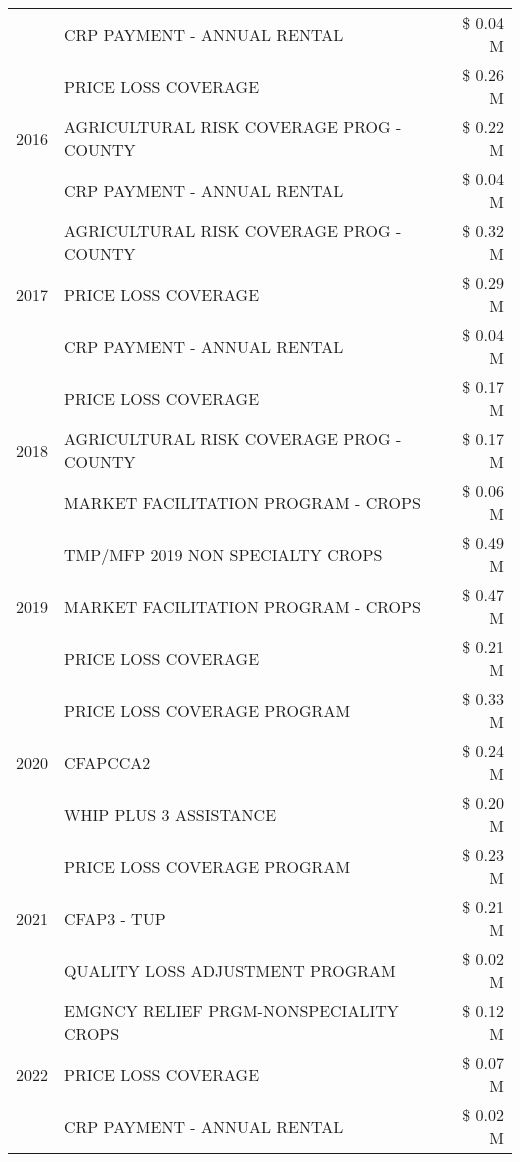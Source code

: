 \begin{tabular}{llr}
 & CRP PAYMENT - ANNUAL RENTAL & \$ 0.04 M \\
\cline{1-3}
\multirow[t]{3}{*}{2016} & PRICE LOSS COVERAGE & \$ 0.26 M \\
 & AGRICULTURAL RISK COVERAGE PROG - COUNTY & \$ 0.22 M \\
 & CRP PAYMENT - ANNUAL RENTAL & \$ 0.04 M \\
\cline{1-3}
\multirow[t]{3}{*}{2017} & AGRICULTURAL RISK COVERAGE PROG - COUNTY & \$ 0.32 M \\
 & PRICE LOSS COVERAGE & \$ 0.29 M \\
 & CRP PAYMENT - ANNUAL RENTAL & \$ 0.04 M \\
\cline{1-3}
\multirow[t]{3}{*}{2018} & PRICE LOSS COVERAGE & \$ 0.17 M \\
 & AGRICULTURAL RISK COVERAGE PROG - COUNTY & \$ 0.17 M \\
 & MARKET FACILITATION PROGRAM - CROPS & \$ 0.06 M \\
\cline{1-3}
\multirow[t]{3}{*}{2019} & TMP/MFP 2019 NON SPECIALTY CROPS & \$ 0.49 M \\
 & MARKET FACILITATION PROGRAM - CROPS & \$ 0.47 M \\
 & PRICE LOSS COVERAGE & \$ 0.21 M \\
\cline{1-3}
\multirow[t]{3}{*}{2020} & PRICE LOSS COVERAGE PROGRAM & \$ 0.33 M \\
 & CFAPCCA2 & \$ 0.24 M \\
 & WHIP PLUS 3 ASSISTANCE & \$ 0.20 M \\
\cline{1-3}
\multirow[t]{3}{*}{2021} & PRICE LOSS COVERAGE PROGRAM & \$ 0.23 M \\
 & CFAP3 - TUP & \$ 0.21 M \\
 & QUALITY LOSS ADJUSTMENT PROGRAM & \$ 0.02 M \\
\cline{1-3}
\multirow[t]{3}{*}{2022} & EMGNCY RELIEF PRGM-NONSPECIALITY CROPS & \$ 0.12 M \\
 & PRICE LOSS COVERAGE & \$ 0.07 M \\
 & CRP PAYMENT - ANNUAL RENTAL & \$ 0.02 M \\
\cline{1-3}
\bottomrule
\end{tabular}
